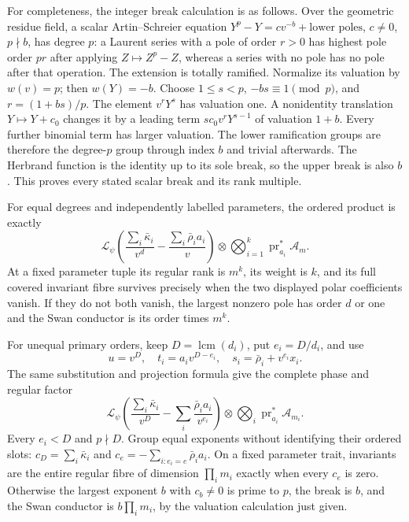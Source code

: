 \documentclass[11pt,a4paper]{article}
\theoremstyle{definition}
\begin{document}
For completeness, the integer break calculation is as follows.
Over the geometric residue field, a scalar Artin--Schreier equation
\(Y^p-Y=cv^{-b}+\text{lower poles}\), \(c\ne0\), \(p\nmid b\),
has degree \(p\): a Laurent series with a pole of order \(r>0\)
has highest pole order \(pr\) after applying \(Z\mapsto Z^p-Z\),
whereas a series with no pole has no pole after that operation.
The extension is totally ramified.  Normalize its valuation by
\(w(v)=p\); then \(w(Y)=-b\).  Choose
\(1\le s<p\), \(-bs\equiv1\pmod p\), and
\(r=(1+bs)/p\).  The element \(v^rY^s\) has valuation one.
A nonidentity translation \(Y\mapsto Y+c_0\) changes it by a
leading term \(sc_0v^rY^{s-1}\) of valuation \(1+b\).
Every further binomial term has larger valuation.
The lower ramification groups are therefore the degree-\(p\)
group through index \(b\) and trivial afterwards.
The Herbrand function is the identity up to its sole break, so
the upper break is also \(b\).  This proves every stated scalar
break and its rank multiple.

For equal degrees and independently labelled parameters, the
ordered product is exactly
\[
 \mathcal L_\psi
     \left(\frac{\sum_i\bar\kappa_i}{v^d}
               -\frac{\sum_i\bar\rho_i a_i}{v}\right)
    \otimes\bigotimes_{i=1}^k\operatorname{pr}_{a_i}^*\mathcal A_m .
                                                               \tag{FF24}
\]
At a fixed parameter tuple its regular rank is \(m^k\), its weight
is \(k\), and its full covered invariant fibre survives precisely
when the two displayed polar coefficients vanish.
If they do not both vanish, the largest nonzero pole has order
\(d\) or one and the Swan conductor is its order times \(m^k\).

For unequal primary orders, keep \(D=\operatorname{lcm}(d_i)\),
put \(e_i=D/d_i\), and use
\[
 u=v^D,\quad t_i=a_i v^{D-e_i},\quad
           s_i=\bar\rho_i+v^{e_i}x_i .
                                                               \tag{FF25}
\]
The same substitution and projection formula give the complete phase
and regular factor
\[
 \mathcal L_\psi
     \left(\frac{\sum_i\bar\kappa_i}{v^D}
             -\sum_i\frac{\bar\rho_i a_i}{v^{e_i}}\right)
       \otimes\bigotimes_i\operatorname{pr}_{a_i}^*\mathcal A_{m_i}.
                                                               \tag{FF26}
\]
Every \(e_i<D\) and \(p\nmid D\).  Group equal exponents without
identifying their ordered slots:
\(c_D=\sum_i\bar\kappa_i\) and
\(c_e=-\sum_{i:e_i=e}\bar\rho_i a_i\).
On a fixed parameter trait, invariants are the entire regular fibre
of dimension \(\prod_i m_i\) exactly when every \(c_e\) is zero.
Otherwise the largest exponent \(b\) with \(c_b\ne0\) is prime
to \(p\), the break is \(b\), and the Swan conductor is
\(b\prod_i m_i\), by the valuation calculation just given.
\end{document}
